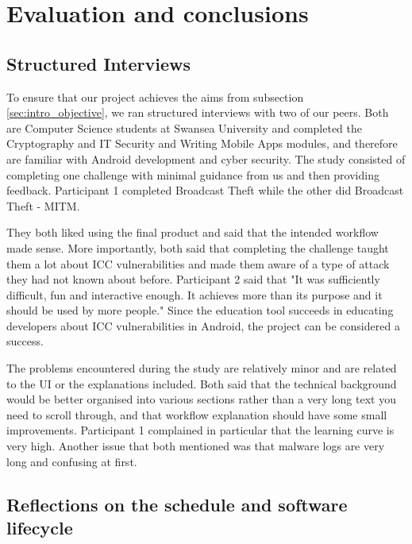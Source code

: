 \chapter{Evaluation and conclusions}
	\label{chap:evaluation_conclusion}
	
	\vspace{-9mm}
	\section{Structured Interviews}
	    \label{sec:user_studies}
	\vspace{-3mm}
	To ensure that our project achieves the aims from subsection \ref{sec:intro_objective}, we ran structured interviews with two of our peers. Both are Computer Science students at Swansea University and completed the Cryptography and IT Security and Writing Mobile Apps modules, and therefore are familiar with Android development and cyber security. The study consisted of completing one challenge with minimal guidance from us and then providing feedback. Participant 1 completed Broadcast Theft while the other did Broadcast Theft - MITM.
	
	\vspace{-1mm}
	They both liked using the final product and said that the intended workflow made sense. More importantly, both said that completing the challenge taught them a lot about ICC vulnerabilities and made them aware of a type of attack they had not known about before. Participant 2 said that "It was sufficiently difficult, fun and interactive enough. It achieves more than its purpose and it should be used by more people." Since the education tool succeeds in educating developers about ICC vulnerabilities in Android, the project can be considered a success.
	
	\vspace{-1mm}
	The problems encountered during the study are relatively minor and are related to the UI or the explanations included. Both said that the technical background would be better organised into various sections rather than a very long text you need to scroll through, and that workflow explanation should have some small improvements. Participant 1 complained in particular that the learning curve is very high. Another issue that both mentioned was that malware logs are very long and confusing at first.
	
	\section{Reflections on the schedule and software lifecycle}
	    \label{sec:schedule_slc_reflection}
	    

